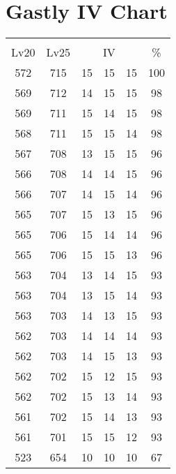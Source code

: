 \documentclass{article}%
\begin{document}
%
\normalsize%
\section{Gastly IV Chart}%
\label{sec:Gastly IV Chart}%
\renewcommand{\arraystretch}{1.5}%
\begin{tabular}{|c|c|c|c|c|c|}%
\hline%
\multicolumn{6}{|c|}{\textcolor{white}{ 
\linebreak{Gastly}
}%
\cellcolor{black}}\\%
\multicolumn{1}{|c}{Lv20}&\multicolumn{1}{c|}{Lv25}&\multicolumn{3}{c|}{IV}&\multicolumn{1}{|c|}{\%}\\%
\hline%
\rowcolor{color100}%
572&715&15&15&15&100\\%
\hline%
\rowcolor{color98}%
569&712&14&15&15&98\\%
\hline%
\rowcolor{color98}%
569&711&15&14&15&98\\%
\hline%
\rowcolor{color98}%
568&711&15&15&14&98\\%
\hline%
\rowcolor{color96}%
567&708&13&15&15&96\\%
\hline%
\rowcolor{color96}%
566&708&14&14&15&96\\%
\hline%
\rowcolor{color96}%
566&707&14&15&14&96\\%
\hline%
\rowcolor{color96}%
565&707&15&13&15&96\\%
\hline%
\rowcolor{color96}%
565&706&15&14&14&96\\%
\hline%
\rowcolor{color96}%
565&706&15&15&13&96\\%
\hline%
\rowcolor{color93}%
563&704&13&14&15&93\\%
\hline%
\rowcolor{color93}%
563&704&13&15&14&93\\%
\hline%
\rowcolor{color93}%
563&703&14&13&15&93\\%
\hline%
\rowcolor{color93}%
562&703&14&14&14&93\\%
\hline%
\rowcolor{color93}%
562&703&14&15&13&93\\%
\hline%
\rowcolor{color93}%
562&702&15&12&15&93\\%
\hline%
\rowcolor{color93}%
562&702&15&13&14&93\\%
\hline%
\rowcolor{color93}%
561&702&15&14&13&93\\%
\hline%
\rowcolor{color93}%
561&701&15&15&12&93\\%
\hline%
\rowcolor{color91}%
523&654&10&10&10&67\\%
\end{tabular}

%
\end{document}
